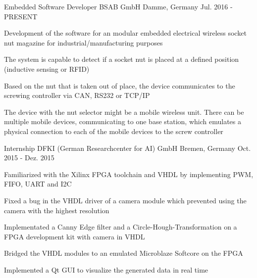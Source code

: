 \begin{cventries}
  \cventry
    {Embedded Software Developer} %
    {BSAB GmbH} %
    {Damme, Germany} %
    {Jul. 2016 - PRESENT} %
    {
      \begin{cvitems} %
        \item {Development of the software for an modular embedded electrical wireless socket nut magazine for industrial/manufacturing purposes}
        \item {The system is capable to detect if a socket nut is placed at a defined position (inductive sensing or RFID)}
        \item {Based on the nut that is taken out of place, the device communicates to the screwing controller via CAN, RS232 or TCP/IP}
        \item {The device with the nut selector might be a mobile wireless unit. There can be multiple mobile devices, communicating to one base station, which emulates a physical connection to each of the mobile devices to the screw controller}
      \end{cvitems}
    }

  \cventry
    {Internship} %
    {DFKI (German Researchcenter for AI) GmbH} %
    {Bremen, Germany} %
    {Oct. 2015 - Dez. 2015} %
    {
      \begin{cvitems} %
        \item {Familiarized with the Xilinx FPGA toolchain and VHDL by implementing PWM, FIFO, UART and I2C}
        \item {Fixed a bug in the VHDL driver of a camera module which prevented using the camera with the highest resolution}
        \item {Implementated a Canny Edge filter and a Circle-Hough-Transformation on a FPGA development kit with camera in VHDL}
        \item {Bridged the VHDL modules to an emulated Microblaze Softcore on the FPGA}
        \item {Implemented a Qt GUI to visualize the generated data in real time}
      \end{cvitems}
    }

\end{cventries}
